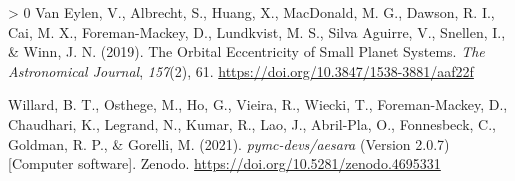 \documentclass[10pt,a4paper,onecolumn]{article}
\newlength{\cslhangindent}
\newenvironment{CSLReferences}[3] %
 {%
  \setlength{\parindent}{0pt}
  \ifodd #1 \everypar{\setlength{\hangindent}{\cslhangindent}}\ignorespaces\fi
  \ifnum #2 > 0
  \setlength{\parskip}{#2\baselineskip}
  \fi
 }%
 {}
\begin{document}
\begin{CSLReferences}{1}{0}
\leavevmode\hypertarget{ref-vaneylen19}{}%
Van Eylen, V., Albrecht, S., Huang, X., MacDonald, M. G., Dawson, R. I.,
Cai, M. X., Foreman-Mackey, D., Lundkvist, M. S., Silva Aguirre, V.,
Snellen, I., \& Winn, J. N. (2019). {The Orbital Eccentricity of Small
Planet Systems}. \emph{The Astronomical Journal}, \emph{157}(2), 61.
\url{https://doi.org/10.3847/1538-3881/aaf22f}

\leavevmode\hypertarget{ref-aesara}{}%
Willard, B. T., Osthege, M., Ho, G., Vieira, R., Wiecki, T.,
Foreman-Mackey, D., Chaudhari, K., Legrand, N., Kumar, R., Lao, J.,
Abril-Pla, O., Fonnesbeck, C., Goldman, R. P., \& Gorelli, M. (2021).
\emph{{pymc-devs/aesara}} (Version 2.0.7) {[}Computer software{]}.
Zenodo. \url{https://doi.org/10.5281/zenodo.4695331}

\end{CSLReferences}
\end{document}

